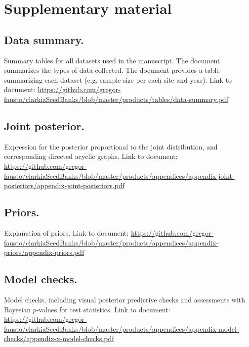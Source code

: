 \documentclass[12pt, oneside, titlepage]{article}   	%
\begin{document}
{\clearpage
\section*{Supplementary material}


\subsection*{Data summary.} Summary tables for all datasets used in the manuscript. The document summarizes the types of data collected. The document provides a table summarizing each dataset (e.g. sample size per each site and year). Link to document: \url{https://github.com/gregor-fausto/clarkiaSeedBanks/blob/master/products/tables/data-summary.pdf}

\subsection*{Joint posterior.} Expression for the posterior proportional to the joint distribution, and corresponding directed acyclic graphs. Link to document: \url{https://github.com/gregor-fausto/clarkiaSeedBanks/blob/master/products/appendices/appendix-joint-posteriors/appendix-joint-posteriors.pdf}

\subsection*{Priors.} Explanation of priors. Link to document: \url{https://github.com/gregor-fausto/clarkiaSeedBanks/blob/master/products/appendices/appendix-priors/appendix-priors.pdf}

\subsection*{Model checks.} Model checks, including visual posterior predictive checks and assessments with Bayesian $p$-values for test statistics. Link to document: \url{https://github.com/gregor-fausto/clarkiaSeedBanks/blob/master/products/appendices/appendix-model-checks/appendix-x-model-checks.pdf}


}
\end{document}
